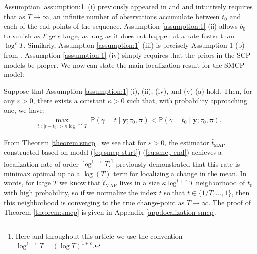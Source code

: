 Assumption \ref{assumption:1} (i) previously appeared in \cite{Cappello21} and \cite{Cappello22} and intuitively requires that as $T \to \infty$, an infinite number of observations accumulate between $t_0$ and each of the end-points of the sequence. Assumption \ref{assumption:1} (ii) allows $b_0$ to vanish as $T$ gets large, as long as it does not happen at a rate faster than $\log^\varepsilon T$. Similarly, Assumption \ref{assumption:1} (iii) is precisely Assumption 1 (b) from \cite{Cappello22}. Assumption \ref{assumption:1} (iv) simply requires that the priors in the SCP models be proper. We now can state the main localization result for the SMCP model:
\begin{theorem}\label{theorem:smcp}
    Suppose that Assumption \ref{assumption:1} (i), (ii), (iv), and (v) (a) hold. Then, for any $\varepsilon > 0$, there exists a constant $\kappa > 0$ such that, with probability approaching one, we have:
    \begin{align*}
        \max_{t \;:\; |t - t_0| > \kappa \log^{1+\varepsilon} T} \; \mathbb{P}(\gamma = t  \;|\; \mathbf{y} ; \tau_0,\pmb{\pi}) < \mathbb{P}(\gamma = t_0  \;|\; \mathbf{y} ; \tau_0,\pmb{\pi}).
    \end{align*}
\end{theorem}
From Theorem \ref{theorem:smcp}, we see that for $\varepsilon >0$, the estimator $\hat{t}_{\text{MAP}}$ constructed based on model (\ref{eq:smcp-start})-(\ref{eq:smcp-end}) achieves a localization rate of order $\log^{1+\varepsilon}T$.\footnote{Here and throughout this article we use the convention $\log^{1+\varepsilon}T = (\log T)^{1+\varepsilon}$.} \cite{Wang2020_localization} previously demonstrated that this rate is minimax optimal up to a $\log(T)$ term for localizing a change in the mean. In words, for large $T$ we know that $\hat{t}_{\text{MAP}}$ lives in a size $\kappa \log^{1+\varepsilon} T$ neighborhood of $t_0$ with high probability, so if we normalize the index $t$ so that $t\in\{1/T, \ldots, 1\}$, then this neighborhood is converging to the true change-point as $T \to \infty$. The proof of Theorem \ref{theorem:smcp} is given in Appendix \ref{app:localization-smcp}.  

